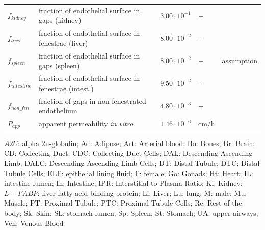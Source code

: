 \documentclass[preprint,12pt,authoryear]{elsarticle}
\begin{document}
\begin{longtable}{P{2cm}P{3.5cm}P{2cm}P{1cm}P{2.5cm}}
$f_{kidney}$        & fraction of endothelial surface in gaps (kidney)       & $3.00 \cdot 10^{-1}$ & $-$ & \citep{bulger_1983} \\
$f_{liver}$         & fraction of endothelial surface in fenestrae (liver)   & $8.00 \cdot 10^{-2}$ & $-$ & \citep{simon-santamaria_2010} \\
$f_{spleen}$        & fraction of endothelial surface in gaps (spleen)       & $8.00 \cdot 10^{-2}$ & $-$ & assumption \\
$f_{intestine}$     & fraction of endothelial surface in fenestrae (intest.) & $9.50 \cdot 10^{-2}$ & $-$ & \citep{simionescu_1974} \\
$f_{non\_fen}$ & fraction of gaps in non-fenestrated endothelium    & $4.80 \cdot 10^{-3}$ & $-$ & \citep{clough_1988} \\
$P_{app}$ & apparent permeability \textit{in vitro}  & $1.46 \cdot 10^{-6}$ & $\text{cm}/\text{h}$ & \citep{ryu_2024} \\
\end{longtable}
\scriptsize
\noindent
$A2U$: alpha 2u-globulin; Ad: Adipose; Art: Arterial blood; Bo: Bones; Br: Brain; CD: Collecting Duct; CDC: Collecting Duct Cells; DAL: Descending-Ascending Limb; DALC: Descending-Ascending Limb Cells; DT: Distal Tubule; DTC: Distal Tubule Cells; ELF: epithelial lining fluid; F: female; Go: Gonads; Ht: Heart; IL: intestine lumen; In: Intestine; IPR: Interstitial-to-Plasma Ratio; Ki: Kidney; $L-FABP$: liver fatty-acid binding protein; Li: Liver; Lu: lung; M: male; Mu: Muscle; PT: Proximal Tubule; PTC: Proximal Tubule Cells; Re: Rest-of-the-body; Sk: Skin; SL: stomach lumen; Sp: Spleen; St: Stomach; UA: upper airways; Ven: Venous Blood\newline
\normalsize
\end{document}
